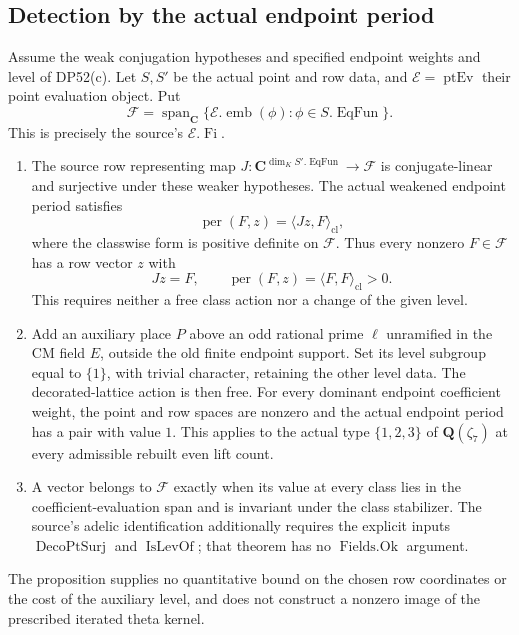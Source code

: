 \subsection{Detection by the actual endpoint period}

\begin{proposition}\label{DP55}
Assume the weak conjugation hypotheses and specified endpoint weights and
level of DP52(c). Let $S,S'$ be the actual point and row data, and
$\mathcal E=\operatorname{ptEv}$ their point evaluation object. Put
\[
 \mathcal F=\operatorname{span}_{\mathbf C}
    \{\mathcal E.\operatorname{emb}(\phi):
                    \phi\in S.\operatorname{EqFun}\}.
\]
This is precisely the source's $\mathcal E.\operatorname{Fi}$.
\begin{enumerate}[label=(\alph*),leftmargin=*]
\item The source row representing map
$J:\mathbf C^{\dim_K S'.\operatorname{EqFun}}\to\mathcal F$
is conjugate-linear and surjective under these weaker hypotheses.
The actual weakened endpoint period satisfies
\[
 \operatorname{per}(F,z)=\langle Jz,F\rangle_{\mathrm{cl}},
\]
where the classwise form is positive definite on $\mathcal F$.
Thus every nonzero $F\in\mathcal F$ has a row vector $z$ with
\[
 Jz=F,\qquad
 \operatorname{per}(F,z)=\langle F,F\rangle_{\mathrm{cl}}>0.
\]
This requires neither a free class action nor a change of the given level.
\item Add an auxiliary place $P$ above an odd rational prime $\ell$
unramified in the CM field $E$, outside the old finite endpoint support.
Set its level subgroup equal to $\{1\}$, with trivial character, retaining
the other level data.
The decorated-lattice action is then free. For every dominant endpoint
coefficient weight, the point and row spaces are nonzero and the actual
endpoint period has a pair with value $1$.
This applies to the actual type $\{1,2,3\}$ of $\mathbf Q(\zeta_7)$
at every admissible rebuilt even lift count.
\item A vector belongs to $\mathcal F$ exactly when its value at every
class lies in the coefficient-evaluation span and is invariant under the
class stabilizer. The source's adelic identification additionally requires
the explicit inputs $\operatorname{DecoPtSurj}$ and
$\operatorname{IsLevOf}$; that theorem has no
$\operatorname{Fields.Ok}$ argument.
\end{enumerate}
The proposition supplies no quantitative bound on the chosen row
coordinates or the cost of the auxiliary level, and does not construct
a nonzero image of the prescribed iterated theta kernel.
\end{proposition}

